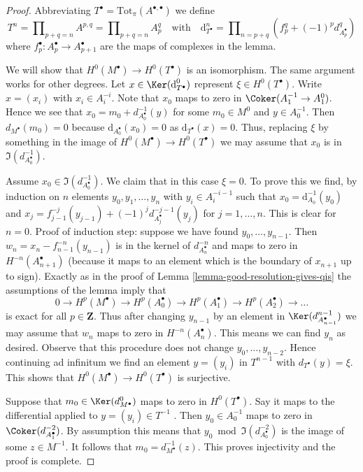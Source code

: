 \begin{proof}
Abbreviating $T^\bullet = \text{Tot}_\pi(A^{\bullet, \bullet})$
we define
$$
T^n = \prod\nolimits_{p + q = n} A^{p, q} =
\prod\nolimits_{p + q = n} A_p^q
\quad\text{with}\quad
\text{d}_{T^\bullet}^n =
\prod\nolimits_{n = p + q} (f_p^q + (-1)^pd_{A_p^\bullet}^q)
$$
where $f_p^\bullet : A_p^\bullet \to A_{p + 1}^\bullet$
are the maps of complexes in the lemma.

\medskip\noindent
We will show that $H^0(M^\bullet) \to H^0(T^\bullet)$ is an isomorphism.
The same argument works for other degrees.
Let $x \in \Ker(\text{d}_{T^\bullet}^0)$ represent $\xi \in H^0(T^\bullet)$.
Write $x = (x_i)$ with $x_i \in A_i^{-i}$.
Note that $x_0$ maps to zero in $\Coker(A_1^{-1} \to A_1^0)$.
Hence we see that $x_0 = m_0 + d_{A_0^\bullet}^{-1}(y)$ for some
$m_0 \in M^0$ and $y \in A_0^{-1}$.
Then $d_{M^\bullet}(m_0) = 0$ because $\text{d}_{A_0^\bullet}(x_0) = 0$
as $\text{d}_{T^\bullet}(x) = 0$.
Thus, replacing $\xi$ by something in the image of
$H^0(M^\bullet) \to H^0(T^\bullet)$ we may assume that $x_0$
is in $\Im(d^{-1}_{A_0^\bullet})$.

\medskip\noindent
Assume $x_0 \in \Im(d^{-1}_{A_0^\bullet})$. We claim that in this
case $\xi = 0$. To prove this we find, by induction on $n$ elements
$y_0, y_1, \ldots, y_n$ with $y_i \in A_i^{-i - 1}$ such that
$x_0 = \text{d}_{A_0}^{-1}(y_0)$ and
$x_j = f_{j - 1}^{-j}(y_{j - 1}) + (-1)^j d^{-j - 1}_{A_j^\bullet}(y_j)$
for $j = 1, \ldots, n$. This is clear for $n = 0$. Proof of induction step:
suppose we have found $y_0, \ldots, y_{n - 1}$. Then
$w_n = x_n - f_{n - 1}^{-n}(y_{n - 1})$ is in the kernel of
$d^{-n}_{A_n^\bullet}$ and maps to zero in $H^{-n}(A_{n + 1}^\bullet)$
(because it maps to an element which is the boundary
of $x_{n + 1}$ up to sign). Exactly as in the proof of
Lemma \ref{lemma-good-resolution-gives-qis}
the assumptions of the lemma imply that
$$
0 \to
H^p(M^\bullet) \to
H^p(A_0^\bullet) \to
H^p(A_1^\bullet) \to
H^p(A_2^\bullet) \to \ldots
$$
is exact for all $p \in \mathbf{Z}$. Thus after changing $y_{n - 1}$
by an element in $\Ker(d^{n - 1}_{A_{n - 1}^\bullet})$ we may assume
that $w_n$ maps to zero in $H^{-n}(A_n^\bullet)$. This means we
can find $y_n$ as desired. Observe that this procedure does not
change $y_0, \ldots, y_{n - 2}$. Hence continuing ad infinitum
we find an element $y = (y_i)$ in $T^{n - 1}$ with $d_{T^\bullet}(y) = \xi$.
This shows that $H^0(M^\bullet) \to H^0(T^\bullet)$ is surjective.

\medskip\noindent
Suppose that $m_0 \in \Ker(d^0_{M^\bullet})$ maps to zero in $H^0(T^\bullet)$.
Say it maps to the differential applied to $y = (y_i) \in T^{-1}$ .
Then $y_0 \in A_0^{-1}$ maps to zero in $\Coker(d^{-2}_{A_1^\bullet})$.
By assumption this means that $y_0 \bmod \Im(d^{-2}_{A_0^\bullet})$
is the image of some $z \in M^{-1}$. It follows that
$m_0 = d^{-1}_{M^\bullet}(z)$. This proves injectivity and the proof is
complete.
\end{proof}


